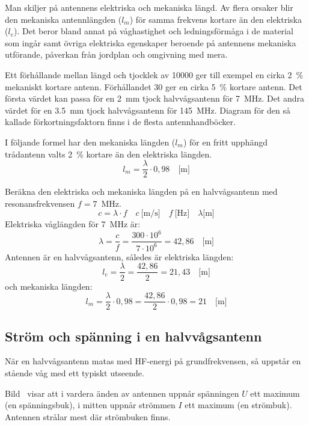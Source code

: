Man skiljer på antennens elektriska och mekaniska längd.
Av flera orsaker blir den mekaniska antennlängden (\(l_m\)) för samma frekvens
kortare än den elektriska (\(l_e\)).
Det beror bland annat på våghastighet och ledningsförmåga i de material som
ingår samt övriga elektriska egenskaper beroende på antennens mekaniska
utförande, påverkan från jordplan och omgivning med mera.

Ett förhållande mellan längd och tjocklek av \num{10000} ger till exempel en
cirka \qty{2}{\percent} mekaniskt kortare antenn.
Förhållandet 30 ger en cirka \qty{5}{\percent} kortare antenn.
Det första värdet kan passa för en \qty{2}{\milli\metre} tjock halvvågsantenn
för \qty{7}{\mega\hertz}.
Det andra värdet för en \qty{3,5}{\milli\metre} tjock halvvågsantenn för
\qty{145}{\mega\hertz}.
Diagram för den så kallade förkortningsfaktorn finns i de flesta
antennhandböcker.

I följande formel har den mekaniska längden (\(l_m\)) för en fritt upphängd
trådantenn valts \qty{2}{\percent} kortare än den elektriska längden.
\[l_m = \frac{\lambda}{2} \cdot 0,98 \quad \text{[m]}\]
\begin{exempelbox}
Beräkna den elektriska och mekaniska längden på en halvvågsantenn med
resonansfrekvensen \(f = 7\)~MHz.
\[
c = \lambda \cdot f
\quad c\ \text{[m/s]} \quad f\ \text{[Hz]} \quad \lambda \text{[m]}
\]
\tcblower
Elektriska våglängden för \qty{7}{\mega\hertz} är:
\[
\lambda = \frac{c}{f} = \frac{300 \cdot 10^6}{7 \cdot 10^6} = 42,86
\quad \text{[m]}
\]
Antennen är en halvvågsantenn, således är elektriska längden:
\[
l_e = \frac{\lambda}{2} = \frac{42,86}{2} = 21,43 \quad \text{[m]}
\]
och mekaniska längden:
\[
l_m = \frac{\lambda}{2} \cdot 0,98 = \frac{42,86}{2}\cdot 0,98 = 21
\quad \text{[m]}
\]
\end{exempelbox}

\newpage
\subsection{Ström och spänning i en halvvågs\-antenn}


När en halvvågsantenn matas med HF-energi på grundfrekvensen, så uppstår en
stående våg med ett typiskt utseende.

Bild~ visar att i vardera änden av antennen uppnår spänningen
\(U\) ett maximum (en spänningsbuk), i mitten uppnår strömmen \(I\)
ett maximum (en strömbuk).
Antennen strålar mest där strömbuken finns.

